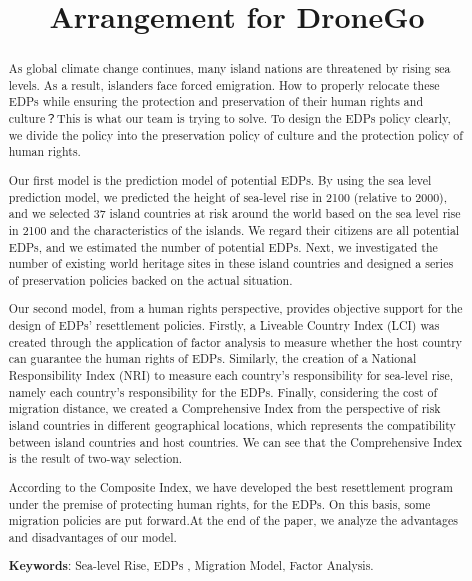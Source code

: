 \documentclass[12pt]{article}  %
\title{Arrangement for DroneGo}  %
\begin{document}
\begin{abstract}

As global climate change continues, many island nations are threatened by rising sea levels. As a result, islanders face forced emigration. How to properly relocate these EDPs while ensuring the protection and preservation of their human rights and culture？This is what our team is trying to solve. To design the EDPs policy clearly, we divide the policy into the preservation policy of culture and the protection policy of human rights.

Our first model is the prediction model of potential EDPs. By using the sea level prediction model, we predicted the height of sea-level rise in 2100 (relative to 2000), and we selected 37 island countries at risk around the world based on the sea level rise in 2100 and the characteristics of the islands. We regard their citizens are all potential EDPs, and we estimated the number of potential EDPs. Next, we investigated the number of existing world heritage sites in these island countries and designed a series of preservation policies backed on the actual situation.

Our second model, from a human rights perspective, provides objective support for the design of EDPs' resettlement policies. Firstly, a Liveable Country Index (LCI) was created through the application of factor analysis to measure whether the host country can guarantee the human rights of EDPs. Similarly, the creation of a National Responsibility Index (NRI) to measure each country's responsibility for sea-level rise, namely each country's responsibility for the EDPs. Finally, considering the cost of migration distance, we created a Comprehensive Index from the perspective of risk island countries in different geographical locations, which represents the compatibility between island countries and host countries. We can see that the Comprehensive Index is the result of two-way selection.

According to the Composite Index, we have developed the best resettlement program under the premise of protecting human rights, for the EDPs. On this basis, some migration policies are put forward.At the end of the paper, we analyze the advantages and disadvantages of our model.


     \vspace{5pt}
     \textbf{Keywords}: Sea-level Rise, EDPs , Migration Model, Factor Analysis.



\end{abstract}
\end{document}
